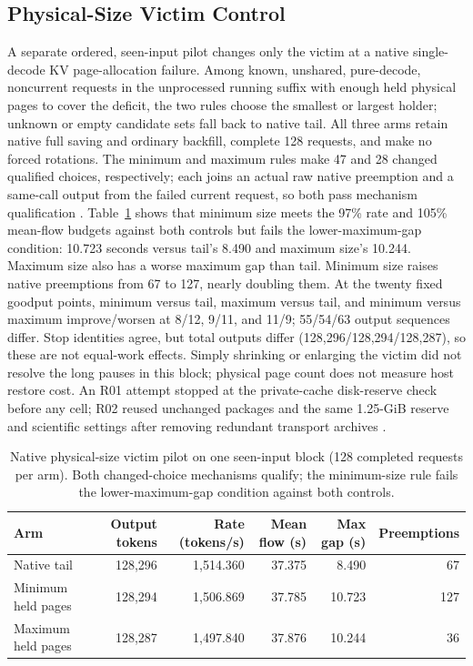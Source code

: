\documentclass[10pt]{article}
\begin{document}
\subsection{Physical-Size Victim Control}
A separate ordered, seen-input pilot changes only the victim at a native single-decode KV page-allocation failure. Among known, unshared, pure-decode, noncurrent requests in the unprocessed running suffix with enough held physical pages to cover the deficit, the two rules choose the smallest or largest holder; unknown or empty candidate sets fall back to native tail. All three arms retain native full saving and ordinary backfill, complete 128 requests, and make no forced rotations. The minimum and maximum rules make 47 and 28 changed qualified choices, respectively; each joins an actual raw native preemption and a same-call output from the failed current request, so both pass mechanism qualification \cite{victimsizer02}. Table~\ref{tab:victimsize} shows that minimum size meets the 97\% rate and 105\% mean-flow budgets against both controls but fails the lower-maximum-gap condition: 10.723 seconds versus tail's 8.490 and maximum size's 10.244. Maximum size also has a worse maximum gap than tail. Minimum size raises native preemptions from 67 to 127, nearly doubling them. At the twenty fixed goodput points, minimum versus tail, maximum versus tail, and minimum versus maximum improve/worsen at 8/12, 9/11, and 11/9; 55/54/63 output sequences differ. Stop identities agree, but total outputs differ (128,296/128,294/128,287), so these are not equal-work effects. Simply shrinking or enlarging the victim did not resolve the long pauses in this block; physical page count does not measure host restore cost. An R01 attempt stopped at the private-cache disk-reserve check before any cell; R02 reused unchanged packages and the same 1.25-GiB reserve and scientific settings after removing redundant transport archives \cite{victimsizeplan}.

\begin{table}[h]
\centering\small
\caption{Native physical-size victim pilot on one seen-input block (128 completed requests per arm). Both changed-choice mechanisms qualify; the minimum-size rule fails the lower-maximum-gap condition against both controls.}
\label{tab:victimsize}
\begin{tabular}{lrrrrr}
\toprule
Arm & Output tokens & Rate (tokens/s) & Mean flow (s) & Max gap (s) & Preemptions \\
\midrule
Native tail & 128,296 & 1,514.360 & 37.375 & 8.490 & 67 \\
Minimum held pages & 128,294 & 1,506.869 & 37.785 & 10.723 & 127 \\
Maximum held pages & 128,287 & 1,497.840 & 37.876 & 10.244 & 36 \\
\bottomrule
\end{tabular}
\end{table}
\end{document}
